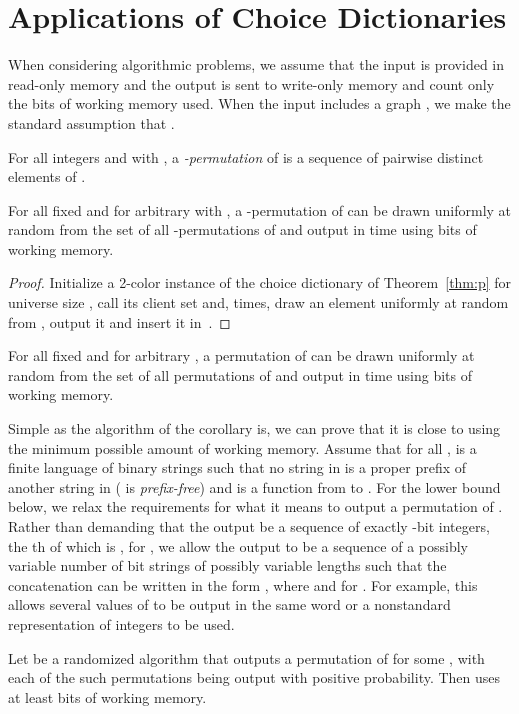 \documentclass[envcountsame,envcountsect,undated,nolinenumbers]{lnthi}
\begin{document}
\section{Applications of Choice Dictionaries}

When considering algorithmic problems, we assume
that the input is provided in read-only memory and
the output is sent to write-only memory
and count only the bits of working memory used.
When the input includes a graph ,
we make the standard assumption that .

For all integers
 and  with , a \emph{-permutation}
of  is
a sequence of  pairwise distinct elements
of .

\begin{theorem}
For all fixed  and
for arbitrary  with ,
a -permutation of 
can be drawn uniformly at
random from the set of all -permutations
of 
and output in  time using
 bits of
working memory.
\end{theorem}

\begin{proof}
Initialize a 2-color instance of the
choice dictionary of Theorem~\ref{thm:p}
for universe size ,
call its client set  and,
 times, draw an element
uniformly at random from ,
output it and insert it in~.
\end{proof}

\begin{corollary}
For all fixed  and
for arbitrary , a
permutation of 
can be drawn uniformly at random
from the set of all permutations of 
and output
in  time using
 bits of
working memory.
\end{corollary}

Simple as the algorithm of the corollary is,
we can prove that it is close to using
the minimum possible amount of working memory.
Assume that for all ,  is
a finite language of binary strings such that
no string in  is a proper prefix of
another string in  ( is \emph{prefix-free})
and  is a function from  to
.
For the lower bound below, we relax the requirements
for what it means to output a permutation
 of .
Rather than demanding that the output be
a sequence of exactly  -bit integers,
the th of which is , for ,
we allow the output to be a sequence
 of a possibly variable
number of bit strings of possibly variable lengths
such that
the concatenation  can be written
in the form , where 
and  for .
For example, this allows several values of 
to be output in the same word or a nonstandard
representation of integers to be used.

\begin{theorem}
Let  be a randomized algorithm that
outputs a permutation
of  for some ,
with each of the  such
permutations being output with positive
probability.
Then  uses at least  bits
of working memory.
\end{theorem}
\end{document}
